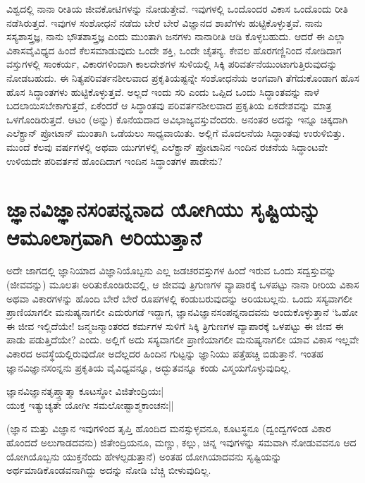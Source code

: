 ವಿಶ್ವದಲ್ಲಿ ನಾನಾ ರೀತಿಯ ಜೀವಕೋಟಿಗಳನ್ನು ನೋಡುತ್ತೇವೆ. ಇವುಗಳಲ್ಲಿ ಒಂದೊಂದರ ವಿಕಾಸ ಒಂದೊಂದು ರೀತಿ ನಡೆಸಿರುತ್ತದೆ. ಇವುಗಳ ಸಂಶೋಧನೆ ನಡೆದು ಬೇರೆ ಬೇರೆ ವಿಜ್ಞಾನದ ಶಾಖೆಗಳು ಹುಟ್ಟಿಕೊಳ್ಳುತ್ತವೆ. ನಾನು ಸಸ್ಯಶಾಸ್ತ್ರಜ್ಞ, ನಾನು ಭೌತಶಾಸ್ತ್ರಜ್ಞ ಎಂದು ಮುಂತಾಗಿ ಜನಗಳು ನಾನಾರೀತಿ ಆಡಿ ಕೊಳ್ಳಬಹುದು. ಆದರೆ ಈ ಎಲ್ಲಾ ವಿಕಾಸವೈವಿಧ್ಯದ ಹಿಂದೆ ಕೆಲಸಮಾಡುವುದು ಒಂದೇ ಶಕ್ತಿ, ಒಂದೇ ಚೈತನ್ಯ. ಕೇವಲ ಹೊರಗಣ್ಣಿನಿಂದ ನೋಡಿದಾಗ ವಸ್ತುಗಳಲ್ಲಿ ಸಾಂಕರ್ಯ, ವಿಕಾರಗಳಿಂದಾಗಿ ಕಾಲದೇಶಗಳ ಸುಳಿಯಲ್ಲಿ ಸಿಕ್ಕಿ ಪರಿವರ್ತನೆಯುಂಟಾಗುತ್ತಿರುವುದನ್ನು ನೋಡಬಹುದು. ಈ ನಿತ್ಯಪರಿವರ್ತನಶೀಲವಾದ ಪ್ರಕೃತಿಯಷ್ಟನ್ನೇ ಸಂಶೋಧನೆಯ ಅಂಗವಾಗಿ ತೆಗೆದುಕೊಂಡಾಗ ಹೊಸ ಹೊಸ ಸಿದ್ಧಾಂತಗಳು ಹುಟ್ಟಿಕೊಳ್ಳುತ್ತವೆ. ಅಲ್ಲದೆ ಇಂದು ಸರಿ ಎಂದು ಒಪ್ಪಿದ ಒಂದು ಸಿದ್ಧಾಂತವನ್ನು ನಾಳೆ ಬದಲಾಯಿಸಬೇಕಾಗುತ್ತದೆ, ಏಕೆಂದರೆ ಆ ಸಿದ್ಧಾಂತವು ಪರಿವರ್ತನಶೀಲವಾದ ಪ್ರಕೃತಿಯ ಏಕದೇಶವನ್ನು ಮಾತ್ರ ಒಳಗೊಂಡಿರುತ್ತದೆ. ಆಟಂ (ಅನ್ನು) ಕೊನೆಯದಾದ ಅವಿಭಾಜ್ಯವಸ್ತುವೆಂದರು. ಅನಂತರ ಅದನ್ನು ಇನ್ನೂ ಚಿಕ್ಕದಾಗಿ ಎಲೆಕ್ಟ್ರಾನ್ ಪ್ರೋಟಾನ್ ಮುಂತಾಗಿ ಒಡೆಯಲು ಸಾಧ್ಯವಾಯಿತು. ಅಲ್ಲಿಗೆ ಮೊದಲನೆಯ ಸಿದ್ಧಾಂತವು ಉರುಳಿಬಿತ್ತು. ಮುಂದೆ ಕೆಲವು ವರ್ಷಗಳಲ್ಲಿ ಅಥವಾ ಯುಗಗಳಲ್ಲಿ ಎಲೆಕ್ಟ್ರಾನ್ ಪ್ರೋಟಾನಿನ ಇಂದಿನ ರಚನೆಯ ಸಿದ್ಧಾಂಟವೇ ಉಳಿಯದೇ ಪರಿವರ್ತನೆ ಹೊಂದಿದಾಗ ಇಂದಿನ ಸಿದ್ಧಾಂತಗಳ ಪಾಡೇನು?

\section*{ಜ್ಞಾನವಿಜ್ಞಾನಸಂಪನ್ನನಾದ ಯೋಗಿಯು ಸೃಷ್ಟಿಯನ್ನು ಆಮೂಲಾಗ್ರವಾಗಿ ಅರಿಯುತ್ತಾನೆ}

ಅದೇ ಜಾಗದಲ್ಲಿ ಜ್ಞಾನಿಯಾದ ವಿಜ್ಞಾನಿಯೊಬ್ಬನು ಎಲ್ಲ ಜಡಚರವಸ್ತುಗಳ ಹಿಂದೆ ಇರುವ ಒಂದು ಸದ್ವಸ್ತುವನ್ನು (ಜೀವವನ್ನು) ಮೂಲತಃ ಅರಿತುಕೊಂಡಿರುವಲ್ಲಿ, ಆ ಜೀವವು ತ್ರಿಗುಣಗಳ ವ್ಯಾಪಾರಕ್ಕೆ ಒಳಪಟ್ಟು ನಾನಾ ರೀರಿಯ ವಿಕಾಸ ಅಥವಾ ವಿಕಾರಗಳನ್ನು ಹೊಂದಿ ಬೇರೆ ಬೇರೆ ರೂಪಗಳಲ್ಲಿ ಕಂಡುಬರುವುದನ್ನು ಅರಿಯಬಲ್ಲನು. ಒಂದು ಸಸ್ಯವಾಗಲೀ ಪ್ರಾಣಿಯಾಗಲೀ ಮನುಷ್ಯನಾಗಲೀ ಎದುರುಗಡೆ ಇದ್ದಾಗ, ಜ್ಞಾನವಿಜ್ಞಾನಸಂಪನ್ನನಾದವನು ಅಂದುಕೊಳ್ಳುತ್ತಾನೆ `ಓಹೋ ಈ ಜೀವ ಇಲ್ಲಿದೆಯೇ! ಜನ್ಮಜನ್ಮಾಂತರದ ಕರ್ಮಗಳ ಸುಳಿಗೆ ಸಿಕ್ಕಿ  ತ್ರಿಗುಣಗಳ ವ್ಯಾಪಾರಕ್ಕೆ ಒಳಪಟ್ಟು ಈ ಜೀವ ಈ ಪಾಡು ಪಡುತ್ತಿದೆಯೇ? ಎಂದು. ಅಲ್ಲಿಗೆ ಅದು ಸಸ್ಯವಾಗಲೀ ಪ್ರಾಣಿಯಾಗಲೀ ಮನುಷ್ಯನಾಗಲೀ ಯಾವ ವಿಕಾಸ ಇಲ್ಲವೇ ವಿಕಾರದ ಅವಸ್ಥೆಯಲ್ಲಿರುವುದೋ ಅದೆಲ್ಲದರ ಹಿಂದಿನ ಗುಟ್ಟನ್ನು ಜ್ಞಾನಿಯು ಪತ್ತೆಹಚ್ಚಿ ಬಿಡುತ್ತಾನೆ. ಇಂತಹ ಜ್ಞಾನವಿಜ್ಞಾನಸಂನ್ನನು ಪ್ರಕೃತಿಯ ವೈವಿಧ್ಯವನ್ನೂ, ಅದ್ಭುತವನ್ನೂ ಕಂಡು ವಿಸ್ಮಯಗೊಳ್ಳುವುದಿಲ್ಲ.

\begin{shloka}
ಜ್ಞಾನವಿಜ್ಞಾನತೃಪ್ತ್ತಾತ್ಮಾ ಕೂಟಸ್ಥೋ ವಿಜಿತೇಂದ್ರಿಯಃ|\\
ಯುಕ್ತ ಇತ್ಯುಚ್ಯತೇ ಯೋಗೀ ಸಮಲೋಷ್ಟಾಶ್ಮಕಾಂಚನಃ||
\end{shloka}

(ಜ್ಞಾನ ಮತ್ತು ವಿಜ್ಞಾನ ಇವುಗಳಿಂದ ತೃಪ್ತಿ ಹೊಂದಿದ ಮನಸ್ಸುಳ್ಳವನೂ, ಕೂಟಸ್ಥನೂ (ದ್ವಂದ್ವಗಳಿಂಡ ವಿಕಾರ ಹೊಂದದೆ ಅಲುಗಾಡದವನು) ಜಿತೇಂದ್ರಿಯನೂ, ಮಣ್ಣು, ಕಲ್ಲು, ಚಿನ್ನ ಇವುಗಳನ್ನು ಸಮವಾಗಿ ನೋಡುವವನೂ ಆದ ಯೋಗಿಯೊಬ್ಬನು ಯುಕ್ತನೆಂದು ಹೇಳಲ್ಪಡುತ್ತಾನೆ) ಅಂತಹ ಯೋಗಿಯಾದವನು ಸೃಷ್ಟಿಯನ್ನು ಅರ್ಥಮಾಡಿಕೊಂಡವನಾಗಿದ್ದು ಅದನ್ನು ನೋಡಿ ಬೆಚ್ಚಿ ಬೀಳುವುದಿಲ್ಲ.

